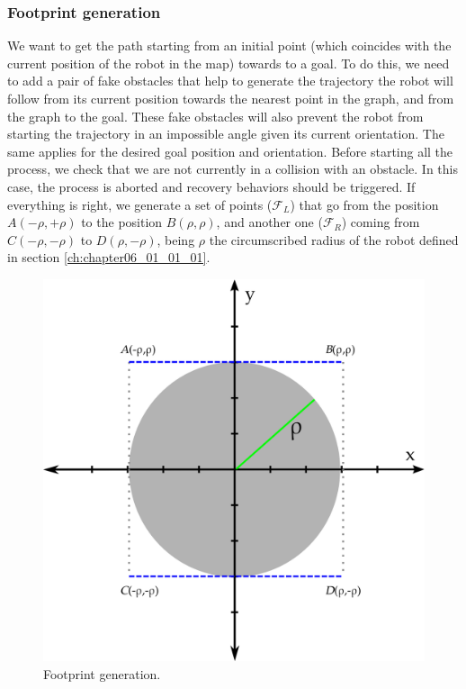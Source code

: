\subsubsection{Footprint generation}\label{ch:chapter06_01_02_02}

We want to get the path starting from an initial point (which coincides with the current position of the robot in the map) towards to a goal. To do this, we need to add a pair of fake obstacles that help to generate the trajectory the robot will follow from its current position towards the nearest point in the graph, and from the graph to the goal. These fake obstacles will also prevent the robot from starting the trajectory in an impossible angle given its current orientation. The same applies for the desired goal position and orientation. Before starting all the process, we check that we are not currently in a collision with an obstacle. In this case, the process is aborted and recovery behaviors should be triggered. If everything is right, we generate a set of points ($\mathcal{F}_L$) that go from the position $A(-\rho, +\rho)$ to the position $B(\rho, \rho)$, and another one ($\mathcal{F}_R$) coming from $C(-\rho, -\rho)$ to $D(\rho, -\rho)$, being $\rho$ the circumscribed radius of the robot defined in section \ref{ch:chapter06_01_01_01}. 

\begin{figure}[h!]
  \centering
  \includegraphics[width=\textwidth, trim=0 0 0 0,clip]{figure5}
  \caption{Footprint generation.}
  \label{fig:cp06_footprint_generation}
\end{figure}%

